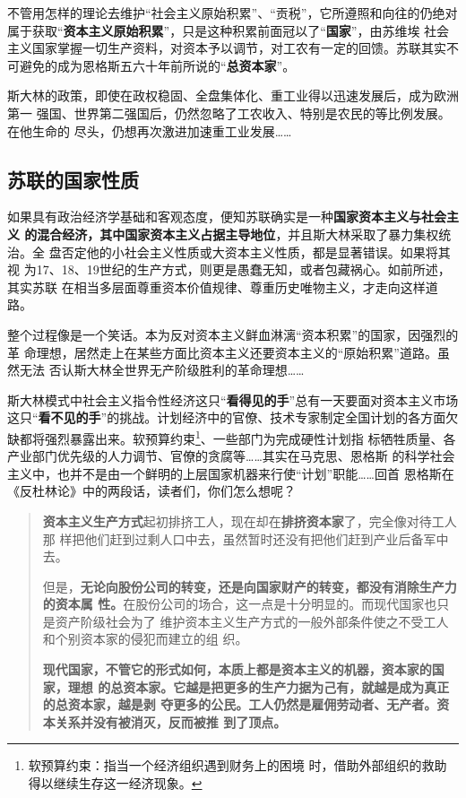 不管用怎样的理论去维护“社会主义原始积累”、“贡税”，它所遵照和向往的仍绝对
属于获取“\textbf{资本主义原始积累}”，只是这种积累前面冠以了“\textbf{国家}”，由苏维埃
社会主义国家掌握一切生产资料，对资本予以调节，对工农有一定的回馈。苏联其实不
可避免的成为恩格斯五六十年前所说的“\textbf{总资本家}”。

斯大林的政策，即使在政权稳固、全盘集体化、重工业得以迅速发展后，成为欧洲第一
强国、世界第二强国后，仍然忽略了工农收入、特别是农民的等比例发展。在他生命的
尽头，仍想再次激进加速重工业发展……

\subsection{苏联的国家性质}

如果具有政治经济学基础和客观态度，便知苏联确实是一种\textbf{国家资本主义与社会主义
  的混合经济，其中国家资本主义占据主导地位}，并且斯大林采取了暴力集权统治。全
盘否定他的小社会主义性质或大资本主义性质，都是显著错误。如果将其视
为17、18、19世纪的生产方式，则更是愚蠢无知，或者包藏祸心。如前所述，其实苏联
在相当多层面尊重资本价值规律、尊重历史唯物主义，才走向这样道路。

整个过程像是一个笑话。本为反对资本主义鲜血淋漓“资本积累”的国家，因强烈的革
命理想，居然走上在某些方面比资本主义还要资本主义的“原始积累”道路。虽然无法
否认斯大林全世界无产阶级胜利的革命理想……


斯大林模式中社会主义指令性经济这只“\textbf{看得见的手}”总有一天要面对资本主义市场
这只“\textbf{看不见的手}”的挑战。计划经济中的官僚、技术专家制定全国计划的各方面欠
缺都将强烈暴露出来。软预算约束\footnote{软预算约束：指当一个经济组织遇到财务上的困境
  时，借助外部组织的救助得以继续生存这一经济现象。}、一些部门为完成硬性计划指
标牺牲质量、各产业部门优先级的人力调节、官僚的贪腐等……其实在马克思、恩格斯
的科学社会主义中，也并不是由一个鲜明的上层国家机器来行使“计划”职能……回首
恩格斯在《反杜林论》中的两段话，读者们，你们怎么想呢？
\begin{quotation}
  \textbf{资本主义生产方式}起初排挤工人，现在却在\textbf{排挤资本家}了，完全像对待工人那
  样把他们赶到过剩人口中去，虽然暂时还没有把他们赶到产业后备军中去。

  但是，\textbf{无论向股份公司的转变，还是向国家财产的转变，都没有消除生产力的资本属
  性。}在股份公司的场合，这一点是十分明显的。而现代国家也只是资产阶级社会为了
  维护资本主义生产方式的一般外部条件使之不受工人和个别资本家的侵犯而建立的组
  织。

  \textbf{现代国家，不管它的形式如何，本质上都是资本主义的机器，资本家的国家，理想
  的总资本家。它越是把更多的生产力据为己有，就越是成为真正的总资本家，越是剥
  夺更多的公民。工人仍然是雇佣劳动者、无产者。资本关系并没有被消灭，反而被推
  到了顶点。}
\end{quotation}

